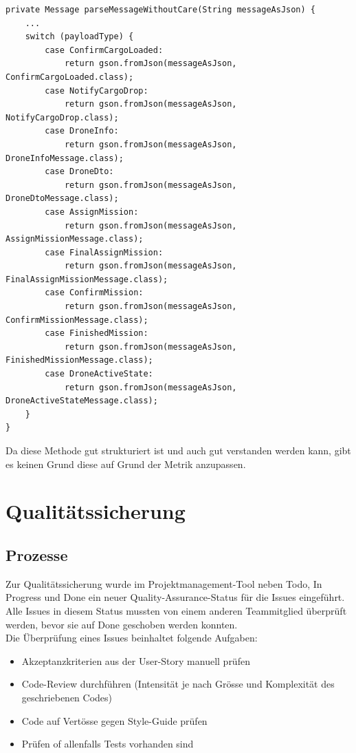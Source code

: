 \begin{lstlisting}
private Message parseMessageWithoutCare(String messageAsJson) {
	...
	switch (payloadType) {
		case ConfirmCargoLoaded:
			return gson.fromJson(messageAsJson, ConfirmCargoLoaded.class);
		case NotifyCargoDrop:
			return gson.fromJson(messageAsJson, NotifyCargoDrop.class);
		case DroneInfo:
			return gson.fromJson(messageAsJson, DroneInfoMessage.class);
		case DroneDto:
			return gson.fromJson(messageAsJson, DroneDtoMessage.class);
		case AssignMission:
			return gson.fromJson(messageAsJson, AssignMissionMessage.class);
		case FinalAssignMission:
			return gson.fromJson(messageAsJson, FinalAssignMissionMessage.class);
		case ConfirmMission:
			return gson.fromJson(messageAsJson, ConfirmMissionMessage.class);
		case FinishedMission:
			return gson.fromJson(messageAsJson, FinishedMissionMessage.class);
		case DroneActiveState:
			return gson.fromJson(messageAsJson, DroneActiveStateMessage.class);
	}
}

\end{lstlisting}

Da diese Methode gut strukturiert ist und auch gut verstanden werden kann, gibt es keinen Grund diese auf Grund der Metrik anzupassen.

\section{Qualitätssicherung}

\subsection{Prozesse}

Zur Qualitätssicherung wurde im Projektmanagement-Tool neben Todo, In Progress und Done ein neuer Quality-Assurance-Status für die Issues eingeführt. Alle Issues in diesem Status mussten von einem anderen Teammitglied überprüft werden, bevor sie auf Done geschoben werden konnten. \\

Die Überprüfung eines Issues beinhaltet folgende Aufgaben:

\begin{itemize}
	\item{Akzeptanzkriterien aus der User-Story manuell prüfen}
	\item{Code-Review durchführen (Intensität je nach Grösse und Komplexität des geschriebenen Codes)}
	\item{Code auf Vertösse gegen Style-Guide prüfen}
	\item{Prüfen of allenfalls Tests vorhanden sind}
\end{itemize}

